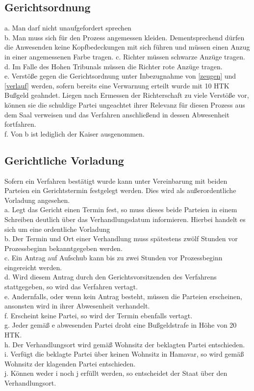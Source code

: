 \documentclass{article}
\begin{document}
\subsection{Gerichtsordnung}\label{gordnung}
a. Man darf nicht unaufgefordert sprechen\\
b. Man muss sich für den Prozess angemessen kleiden. Dementsprechend dürfen die Anwesenden keine Kopfbedeckungen mit sich führen und müssen einen Anzug in einer angemessenen Farbe tragen.
c. Richter müssen schwarze Anzüge tragen.\\
d. Im Falle des Hohen Tribunals müssen die Richter rote Anzüge tragen.\\ 
e. Verstöße gegen die Gerichtsordnung unter Inbezugnahme von \ref{zeugen} und \ref{verlauf} werden, sofern bereits eine Verwarnung erteilt wurde mit 10 HTK Bußgeld geahndet. Liegen nach Ermessen der Richterschaft zu viele Verstöße vor, können sie die schuldige Partei ungeachtet ihrer Relevanz für diesen Prozess aus dem Saal verweisen und das Verfahren anschließend in dessen Abwesenheit fortfahren.\\
f. Von b ist lediglich der Kaiser ausgenommen.

\subsection{Gerichtliche Vorladung}
Sofern ein Verfahren bestätigt wurde kann unter Vereinbarung mit beiden Parteien ein Gerichtstermin festgelegt werden. Dies wird als außerordentliche Vorladung angesehen.\\
a. Legt das Gericht einen Termin fest, so muss dieses beide Parteien in einem Schreiben deutlich über das Verhandlungsdatum informieren. Hierbei handelt es sich um eine ordentliche Vorladung\\
b. Der Termin und Ort einer Verhandlung muss spätestens zwölf Stunden vor Prozessbeginn bekanntgegeben werden.\\
c. Ein Antrag auf Aufschub kann bis zu zwei Stunden vor Prozessbeginn eingereicht werden.\\
d. Wird diesem Antrag durch den Gerichtsvorsitzenden des Verfahrens stattgegeben, so wird das Verfahren vertagt.\\
e. Andernfalls, oder wenn kein Antrag besteht, müssen die Parteien erscheinen, ansonsten wird in ihrer Abwesenheit verhandelt.\\
f. Erscheint keine Partei, so wird der Termin ebenfalls vertagt.\\
g. Jeder gemäß e abwesenden Partei droht eine Bußgeldstrafe in Höhe von 20 HTK.\\
h. Der Verhandlungsort wird gemäß Wohnsitz der beklagten Partei entschieden.\\
i. Verfügt die beklagte Partei über keinen Wohnsitz in Hamavar, so wird gemäß Wohnsitz der klagenden Partei entschieden.\\
j. Können weder i noch j erfüllt werden, so entscheidet der Staat über den Verhandlungsort.
\end{document}
